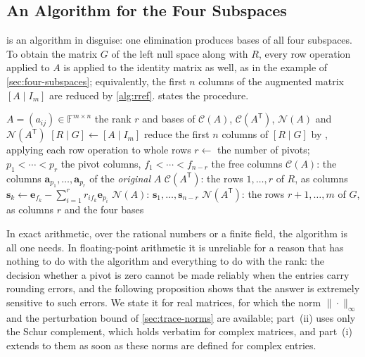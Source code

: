 \subsection{An Algorithm for the Four Subspaces}

 is an algorithm in disguise: one elimination produces bases of all four subspaces. To obtain the matrix $G$ of the left null space along with $R$, every row operation applied to $A$ is applied to the identity matrix as well, as in the example of \cref{sec:four-subspaces}; equivalently, the first $n$ columns of the augmented matrix $[A\mid I_m]$ are reduced by \cref{alg:rref}.  states the procedure.

\begin{algorithm}
\begin{algorithmic}[1]
\Require $A=(a_{ij})\in\mathbb F^{m\times n}$
\Ensure the rank $r$ and bases of $\mathcal C(A)$, $\mathcal C(A^{\mathsf T})$, $\mathcal N(A)$ and $\mathcal N(A^{\mathsf T})$
\State $[R\mid G]\gets[A\mid I_m]$
\State reduce the first $n$ columns of $[R\mid G]$ by , applying each row operation to whole rows 
\State $r\gets$ the number of pivots; $p_1<\cdots<p_r$ the pivot columns, $f_1<\cdots<f_{n-r}$ the free columns
\State $\mathcal C(A)$: the columns $\mathbf a_{p_1},\ldots,\mathbf a_{p_r}$ of the \emph{original} $A$
\State $\mathcal C(A^{\mathsf T})$: the rows $1,\ldots,r$ of $R$, as columns
  \State $\mathbf s_k\gets\mathbf e_{f_k}-\sum_{i=1}^rr_{if_k}\mathbf e_{p_i}$ 
\EndFor
\State $\mathcal N(A)$: $\mathbf s_1,\ldots,\mathbf s_{n-r}$
\State $\mathcal N(A^{\mathsf T})$: the rows $r+1,\ldots,m$ of $G$, as columns
\State \Return $r$ and the four bases
\end{algorithmic}
\caption{Bases of the four fundamental subspaces by Gauss--Jordan elimination (\cref{thm:four-bases}). The reduction performs at most $r$ pivot steps, each of which updates $m-1$ rows of length $m+n$, so it costs at most about $2rm(m+n)$ operations.}
\label{alg:four-subspaces}
\end{algorithm}

In exact arithmetic, over the rational numbers or a finite field, the algorithm is all one needs. In floating-point arithmetic it is unreliable for a reason that has nothing to do with the algorithm and everything to do with the rank: the decision whether a pivot is zero cannot be made reliably when the entries carry rounding errors, and the following proposition shows that the answer is extremely sensitive to such errors. We state it for real matrices, for which the norm $\|\cdot\|_\infty$ and the perturbation bound of \cref{sec:trace-norms} are available; part~(ii) uses only the Schur complement, which holds verbatim for complex matrices, and part~(i) extends to them as soon as these norms are defined for complex entries.

